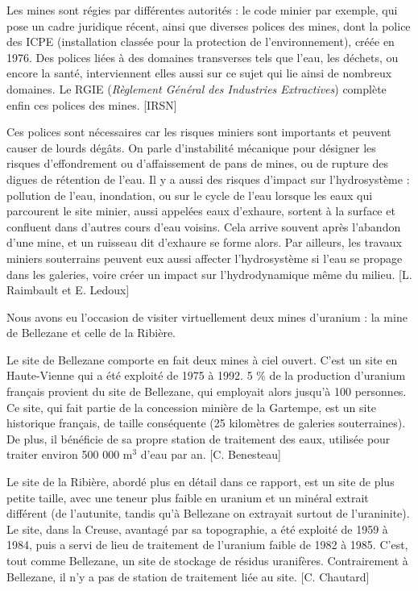 \documentclass{article}
\begin{document}
Les mines sont régies par différentes autorités : le code minier par exemple, qui pose un cadre juridique récent, ainsi que diverses polices des mines, dont la police des ICPE (installation classée pour la protection de l’environnement), créée en 1976. Des polices liées à des domaines transverses tels que l’eau, les déchets, ou encore la santé, interviennent elles aussi sur ce sujet qui lie ainsi de nombreux domaines. Le RGIE (\emph{Règlement Général des Industries Extractives}) complète enfin ces polices des mines. [IRSN]

Ces polices sont nécessaires car les risques miniers sont importants et peuvent causer de lourds dégâts. On parle d’instabilité mécanique pour désigner les risques d’effondrement ou d’affaissement de pans de mines, ou de rupture des digues de rétention de l’eau. Il y a aussi des risques d’impact sur l’hydrosystème : pollution de l’eau, inondation, ou sur le cycle de l’eau lorsque les eaux qui parcourent le site minier, aussi appelées eaux d’exhaure, sortent à la surface et confluent dans d’autres cours d’eau voisins. Cela arrive souvent après l’abandon d’une mine, et un ruisseau dit d’exhaure se forme alors. Par ailleurs, les travaux miniers souterrains peuvent eux aussi affecter l’hydrosystème si l’eau se propage dans les galeries, voire créer un impact sur l’hydrodynamique même du milieu. [L. Raimbault et E. Ledoux]

Nous avons eu l’occasion de visiter virtuellement deux mines d’uranium : la mine de Bellezane et celle de la Ribière. 

Le site de Bellezane comporte en fait deux mines à ciel ouvert. C’est un site en Haute-Vienne qui a été exploité de 1975 à 1992. 5 \% de la production d’uranium français provient du site de Bellezane, qui employait alors jusqu’à 100 personnes. Ce site, qui fait partie de la concession minière de la Gartempe, est un site historique français, de taille conséquente (25 kilomètres de galeries souterraines). De plus, il bénéficie de sa propre station de traitement des eaux, utilisée pour traiter environ 500 000 $\text{m}^3$ d’eau par an. [C. Benesteau]

Le site de la Ribière, abordé plus en détail dans ce rapport, est un site de plus petite taille, avec une teneur plus faible en uranium et un minéral extrait différent (de l’autunite, tandis qu’à Bellezane on extrayait surtout de l’uraninite). Le site, dans la Creuse, avantagé par sa topographie, a été exploité de 1959 à 1984, puis a servi de lieu de traitement de l’uranium faible de 1982 à 1985. C’est, tout comme Bellezane, un site de stockage de résidus uranifères. Contrairement à Bellezane, il n’y a pas de station de traitement liée au site. [C. Chautard]
\end{document}

